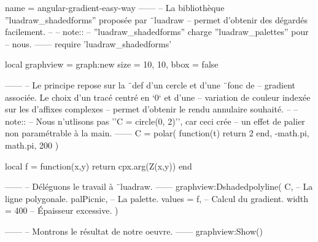 \documentclass{standalone}
\begin{document}
\begin{luadraw*}{name = angular-gradient-easy-way}
------
-- La bibliothèque ''luadraw_shadedforms'' proposée par ¨luadraw
-- permet d'obtenir des dégardés facilement.
--
-- note::
--     ''luadraw_shadedforms'' charge ''luadraw_palettes'' pour
--     nous.
------
require 'luadraw_shadedforms'

local graphview = graph:new{
  size = {10, 10},
  bbox = false
}

------
-- Le principe repose sur la ¨def d'un cercle et d'une ¨fonc de
-- gradient associée. Le choix d'un tracé centré en `0` et d'une
-- variation de couleur indexée sur les \arg d'affixes complexes
-- permet d'obtenir le rendu annulaire souhaité.
--
-- note::
--     Nous n'utlisons pas ''C = circle(0, 2)'', car ceci crée
--     un effet de palier non paramétrable à la main.
------
C = polar(
  function(t)
    return 2
  end,
  -math.pi, math.pi,
  200
)

local f = function(x,y)
  return cpx.arg(Z(x,y))
end

------
-- Déléguons le travail à ¨luadraw.
------
graphview:Dshadedpolyline(
  C,              -- La ligne polygonale.
  palPicnic,      -- La palette.
  {
    values = f,   -- Calcul du gradient.
    width  = 400  -- Épaisseur excessive.
  }
)

------
-- Montrons le résultat de notre oeuvre.
------
graphview:Show()
\end{luadraw*}
\end{document}
